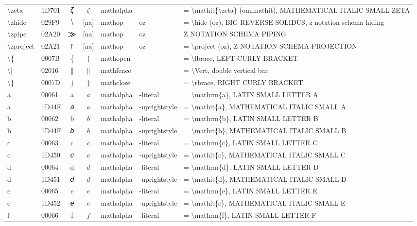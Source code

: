 \documentclass[a4paper,landscape]{article}
\begin{document}
\begin{longtable}{llcclll}
\textbackslash{}zeta & 1D701 & 𝜁 & $\zeta$ & mathalpha &  & = \textbackslash{}mathit\{\textbackslash{}zeta\} (omlmathit), MATHEMATICAL ITALIC SMALL ZETA \\
\textbackslash{}zhide & 029F9 & ⧹ & [na] & mathop & oz & = \textbackslash{}hide (oz), BIG REVERSE SOLIDUS, z notation schema hiding \\
\textbackslash{}zpipe & 02A20 & ⨠ & [na] & mathop & oz & Z NOTATION SCHEMA PIPING \\
\textbackslash{}zproject & 02A21 & ⨡ & [na] & mathop & oz & = \textbackslash{}project (oz), Z NOTATION SCHEMA PROJECTION \\
\textbackslash{}\{ & 0007B & \{ & $\{$ & mathopen &  & = \textbackslash{}lbrace, LEFT CURLY BRACKET \\
\textbackslash{}| & 02016 & ‖ & $\|$ & mathfence &  & = \textbackslash{}Vert, double vertical bar \\
\textbackslash{}\} & 0007D & \} & $\}$ & mathclose &  & = \textbackslash{}rbrace, RIGHT CURLY BRACKET \\
a & 00061 & a & $a$ & mathalpha & -literal & = \textbackslash{}mathrm\{a\}, LATIN SMALL LETTER A \\
a & 1D44E & 𝑎 & $a$ & mathalpha & -uprightstyle & = \textbackslash{}mathit\{a\}, MATHEMATICAL ITALIC SMALL A \\
b & 00062 & b & $b$ & mathalpha & -literal & = \textbackslash{}mathrm\{b\}, LATIN SMALL LETTER B \\
b & 1D44F & 𝑏 & $b$ & mathalpha & -uprightstyle & = \textbackslash{}mathit\{b\}, MATHEMATICAL ITALIC SMALL B \\
c & 00063 & c & $c$ & mathalpha & -literal & = \textbackslash{}mathrm\{c\}, LATIN SMALL LETTER C \\
c & 1D450 & 𝑐 & $c$ & mathalpha & -uprightstyle & = \textbackslash{}mathit\{c\}, MATHEMATICAL ITALIC SMALL C \\
d & 00064 & d & $d$ & mathalpha & -literal & = \textbackslash{}mathrm\{d\}, LATIN SMALL LETTER D \\
d & 1D451 & 𝑑 & $d$ & mathalpha & -uprightstyle & = \textbackslash{}mathit\{d\}, MATHEMATICAL ITALIC SMALL D \\
e & 00065 & e & $e$ & mathalpha & -literal & = \textbackslash{}mathrm\{e\}, LATIN SMALL LETTER E \\
e & 1D452 & 𝑒 & $e$ & mathalpha & -uprightstyle & = \textbackslash{}mathit\{e\}, MATHEMATICAL ITALIC SMALL E \\
f & 00066 & f & $f$ & mathalpha & -literal & = \textbackslash{}mathrm\{f\}, LATIN SMALL LETTER F \\

\end{longtable}
\end{document}
